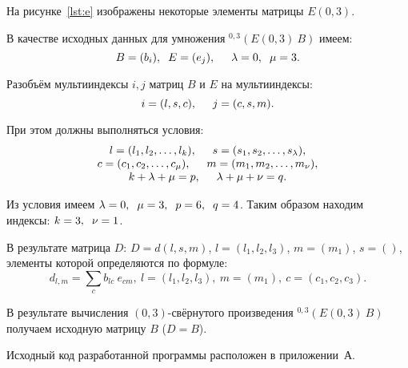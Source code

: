 \pagebreak

На рисунке~\ref{lst:e} изображены некоторые элементы матрицы $E(0,3)$.


В качестве исходных данных для умножения ${}^{0, 3}(E(0,3) \: B)$ имеем:
\begin{equation*}
  B = (b_i), \hspace{2mm} E = (e_j), \hspace{5mm} \lambda = 0, \hspace{2mm} \mu = 3.
\end{equation*}

Разобъём мультииндексы $i, j$ матриц $B$ и $E$ на мультииндексы:
\begin{equation*}
  i = (l, s, c), \hspace{5mm} j = (c, s, m).
\end{equation*}

При этом должны выполняться условия:
\[
  \begin{array}{lc}
    \begin{matrix}
      l = (l_1, l_2, \dots, l_k), \hspace{5mm} s = (s_1, s_2, \dots, s_{\lambda}), \\
      c = (c_1, c_2, \dots, c_\mu), \hspace{5mm} m = (m_1, m_2, \dots, m_{\nu}), \\
      k + \lambda + \mu = p, \hspace{5mm} \lambda + \mu + \nu = q.
    \end{matrix}
  \end{array}
\]

Из условия имеем $\lambda = 0, \hspace{2mm} \mu = 3, \hspace{2mm} p = 6, \hspace{2mm} q = 4$.
Таким образом находим индексы: $k = 3, \hspace{2mm} \nu = 1$.

В результате матрица $D$: $D = d(l, s, m)$, $l = (l_1, l_2, l_3)$, $m = (m_1)$, $s = ()$,
элементы которой определяются по формуле:
\begin{equation*}
  d_{l, m} = \sum_{c} b_{lc} \: e_{cm}, \: l = (l_1, l_2, l_3), \: m = (m_1), \: c = (c_1, c_2, c_3).
\end{equation*}

В результате вычисления $(0,3)$-свёрнутого произведения ${}^{0, 3}(E(0,3) \: B)$
получаем исходную матрицу $B$ ($D = B$).

Исходный код разработанной программы расположен в приложении~А.